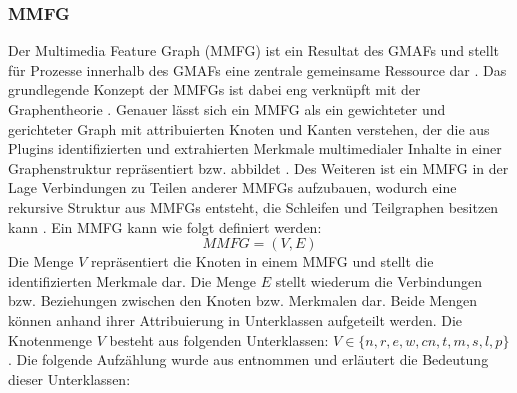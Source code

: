 \subsubsection{MMFG}
\label{sec2:sota:subsubsec:mmfg}
Der Multimedia Feature Graph (MMFG) ist ein Resultat des GMAFs und stellt für Prozesse innerhalb des GMAFs eine zentrale gemeinsame Ressource dar \cite{ai-based-sem-ind-retr-soc}.
Das grundlegende Konzept der MMFGs ist dabei eng verknüpft mit der Graphentheorie \cite{ai-based-sem-ind-retr-soc}.
Genauer lässt sich ein MMFG als ein gewichteter und gerichteter Graph mit attribuierten Knoten und Kanten verstehen, der die aus Plugins identifizierten und extrahierten Merkmale multimedialer Inhalte in einer Graphenstruktur repräsentiert bzw. abbildet \cite{ai-based-sem-ind-retr-soc}.
Des Weiteren ist ein MMFG in der Lage Verbindungen zu Teilen anderer MMFGs aufzubauen, wodurch eine rekursive Struktur aus MMFGs entsteht, die Schleifen und Teilgraphen besitzen kann \cite{ai-based-sem-ind-retr-soc}.
Ein MMFG kann wie folgt definiert werden:
\begin{equation*}
    MMFG = (V, E)
\end{equation*}
Die Menge $V$ repräsentiert die Knoten in einem MMFG und stellt die identifizierten Merkmale dar.
Die Menge $E$ stellt wiederum die Verbindungen bzw. Beziehungen zwischen den Knoten bzw. Merkmalen dar.
Beide Mengen können anhand ihrer Attribuierung in Unterklassen aufgeteilt werden.
Die Knotenmenge $V$ besteht aus folgenden Unterklassen: $V \in \{n,r,e,w,cn,t,m,s,l,p\}$.
Die folgende Aufzählung wurde aus \cite{ai-based-sem-ind-retr-soc} entnommen und erläutert die Bedeutung dieser Unterklassen:
